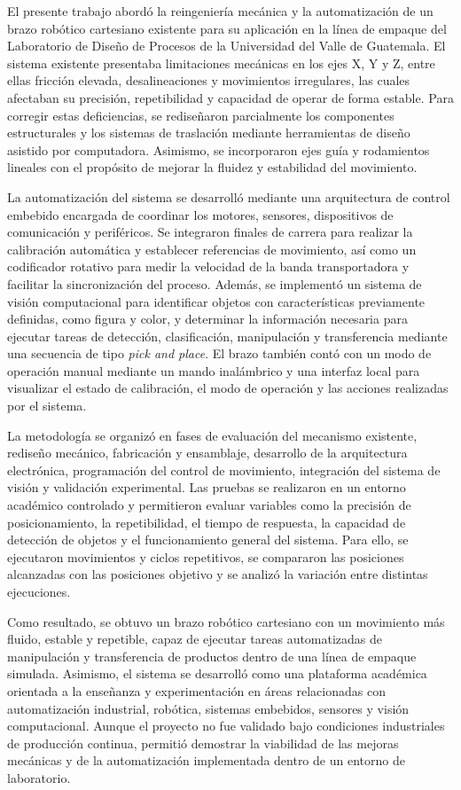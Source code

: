 El presente trabajo abordó la reingeniería mecánica y la automatización de un brazo robótico cartesiano existente para su aplicación en la línea de empaque del Laboratorio de Diseño de Procesos de la Universidad del Valle de Guatemala. El sistema existente presentaba limitaciones mecánicas en los ejes X, Y y Z, entre ellas fricción elevada, desalineaciones y movimientos irregulares, las cuales afectaban su precisión, repetibilidad y capacidad de operar de forma estable. Para corregir estas deficiencias, se rediseñaron parcialmente los componentes estructurales y los sistemas de traslación mediante herramientas de diseño asistido por computadora. Asimismo, se incorporaron ejes guía y rodamientos lineales con el propósito de mejorar la fluidez y estabilidad del movimiento.

La automatización del sistema se desarrolló mediante una arquitectura de control embebido encargada de coordinar los motores, sensores, dispositivos de comunicación y periféricos. Se integraron finales de carrera para realizar la calibración automática y establecer referencias de movimiento, así como un codificador rotativo para medir la velocidad de la banda transportadora y facilitar la sincronización del proceso. Además, se implementó un sistema de visión computacional para identificar objetos con características previamente definidas, como figura y color, y determinar la información necesaria para ejecutar tareas de detección, clasificación, manipulación y transferencia mediante una secuencia de tipo \textit{pick and place}. El brazo también contó con un modo de operación manual mediante un mando inalámbrico y una interfaz local para visualizar el estado de calibración, el modo de operación y las acciones realizadas por el sistema.

La metodología se organizó en fases de evaluación del mecanismo existente, rediseño mecánico, fabricación y ensamblaje, desarrollo de la arquitectura electrónica, programación del control de movimiento, integración del sistema de visión y validación experimental. Las pruebas se realizaron en un entorno académico controlado y permitieron evaluar variables como la precisión de posicionamiento, la repetibilidad, el tiempo de respuesta, la capacidad de detección de objetos y el funcionamiento general del sistema. Para ello, se ejecutaron movimientos y ciclos repetitivos, se compararon las posiciones alcanzadas con las posiciones objetivo y se analizó la variación entre distintas ejecuciones.

Como resultado, se obtuvo un brazo robótico cartesiano con un movimiento más fluido, estable y repetible, capaz de ejecutar tareas automatizadas de manipulación y transferencia de productos dentro de una línea de empaque simulada. Asimismo, el sistema se desarrolló como una plataforma académica orientada a la enseñanza y experimentación en áreas relacionadas con automatización industrial, robótica, sistemas embebidos, sensores y visión computacional. Aunque el proyecto no fue validado bajo condiciones industriales de producción continua, permitió demostrar la viabilidad de las mejoras mecánicas y de la automatización implementada dentro de un entorno de laboratorio.
